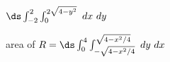 {$\ds \int_{-2}^2\int_{0}^{2\sqrt{4-y^2}} \ dx \ dy$
}
{\noindent \begin{minipage}{\linewidth}
\end{minipage}

area of $R = \ds \int_0^4\int_{-\sqrt{4-x^2/4}}^{\sqrt{4-x^2/4}} \ dy \ dx$
}
